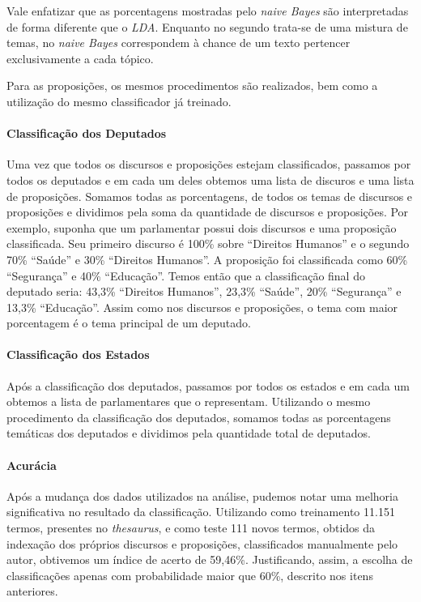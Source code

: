 Vale enfatizar que as porcentagens mostradas pelo \textit{naive Bayes} são interpretadas de forma diferente que o \textit{LDA}. Enquanto no segundo trata-se de uma mistura de temas, no \textit{naive Bayes} correspondem à chance de um texto pertencer exclusivamente a cada tópico.

Para as proposições, os mesmos procedimentos são realizados, bem como a utilização do mesmo classificador já treinado.

\paragraph{Classificação dos Deputados}

Uma vez que todos os discursos e proposições estejam classificados, passamos por todos os deputados e em cada um deles obtemos uma lista de discuros e uma lista de proposições. Somamos todas as porcentagens, de todos os temas de discursos e proposições e dividimos pela soma da quantidade de discursos e proposições. Por exemplo, suponha que um parlamentar possui dois discursos e uma proposição classificada. Seu primeiro discurso é 100\% sobre ``Direitos Humanos'' e o segundo 70\% ``Saúde'' e 30\% ``Direitos Humanos''. A proposição foi classificada como 60\% ``Segurança'' e 40\% ``Educação''. Temos então que a classificação final do deputado seria: 43,3\% ``Direitos Humanos'', 23,3\% ``Saúde'', 20\% ``Segurança'' e 13,3\% ``Educação''. Assim como nos discursos e proposições, o tema com maior porcentagem é o tema principal de um deputado.

\paragraph{Classificação dos Estados}

Após a classificação dos deputados, passamos por todos os estados e em cada um obtemos a lista de parlamentares que o representam. Utilizando o mesmo procedimento da classificação dos deputados, somamos todas as porcentagens temáticas dos deputados e dividimos pela quantidade total de deputados.

\paragraph{Acurácia}

Após a mudança dos dados utilizados na análise, pudemos notar uma melhoria significativa no resultado da classificação. Utilizando como treinamento 11.151 termos, presentes no \textit{thesaurus}, e como teste 111 novos termos, obtidos da indexação dos próprios discursos e proposições, classificados manualmente pelo autor, obtivemos um índice de acerto de 59,46\%. Justificando, assim, a escolha de classificações apenas com probabilidade maior que 60\%, descrito nos itens anteriores.
